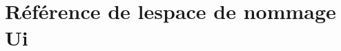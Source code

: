 \hypertarget{namespace_ui}{}\section{Référence de l\textquotesingle{}espace de nommage Ui}
\label{namespace_ui}
